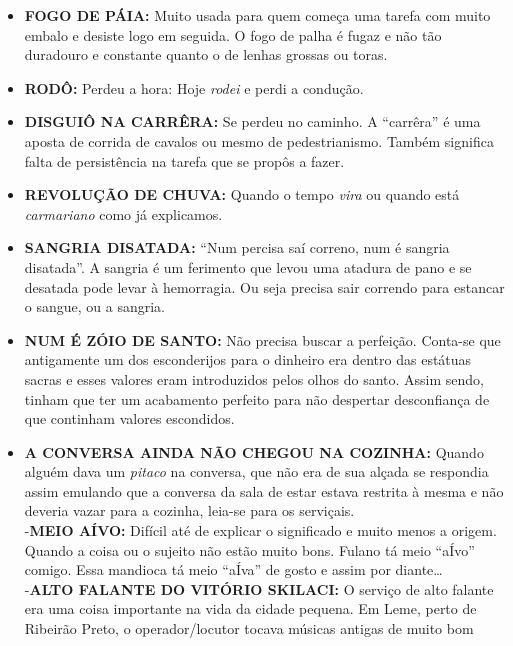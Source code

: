 \documentclass[12pt,brazil,]{book}
\providecommand{\tightlist}{%
  \setlength{\itemsep}{0pt}\setlength{\parskip}{0pt}}
\begin{document}
\begin{itemize}
\tightlist
\item
  \textbf{FOGO DE PÁIA:} Muito usada para quem começa uma tarefa com
  muito embalo e desiste logo em seguida. O fogo de palha é fugaz e não
  tão duradouro e constante quanto o de lenhas grossas ou toras.\\
\item
  \textbf{RODÔ:} Perdeu a hora: Hoje \emph{rodei} e perdi a condução.\\
\item
  \textbf{DISGUIÔ NA CARRÊRA:} Se perdeu no caminho. A ``carrêra'' é uma
  aposta de corrida de cavalos ou mesmo de pedestrianismo. Também
  significa falta de persistência na tarefa que se propôs a fazer.\\
\item
  \textbf{REVOLUÇÃO DE CHUVA:} Quando o tempo \emph{vira} ou quando está
  \emph{carmariano} como já explicamos.\\
\item
  \textbf{SANGRIA DISATADA:} ``Num percisa saí correno, num é sangria
  disatada''. A sangria é um ferimento que levou uma atadura de pano e
  se desatada pode levar à hemorragia. Ou seja precisa sair correndo
  para estancar o sangue, ou a sangria.\\
\item
  \textbf{NUM É ZÓIO DE SANTO:} Não precisa buscar a perfeição. Conta-se
  que antigamente um dos esconderijos para o dinheiro era dentro das
  estátuas sacras e esses valores eram introduzidos pelos olhos do
  santo. Assim sendo, tinham que ter um acabamento perfeito para não
  despertar desconfiança de que continham valores escondidos.\\
\item
  \textbf{A CONVERSA AINDA NÃO CHEGOU NA COZINHA:} Quando alguém dava um
  \emph{pitaco} na conversa, que não era de sua alçada se respondia
  assim emulando que a conversa da sala de estar estava restrita à mesma
  e não deveria vazar para a cozinha, leia-se para os serviçais.\\
  -\textbf{MEIO AÍVO:} Difícil até de explicar o significado e muito
  menos a origem. Quando a coisa ou o sujeito não estão muito bons.
  Fulano tá meio ``aÍvo'' comigo. Essa mandioca tá meio ``aÍva'' de
  gosto e assim por diante\ldots{}\\
  -\textbf{ALTO FALANTE DO VITÓRIO SKILACI:} O serviço de alto falante
  era uma coisa importante na vida da cidade pequena. Em Leme, perto de
  Ribeirão Preto, o operador/locutor tocava músicas antigas de muito bom

\end{itemize}
\end{document}
